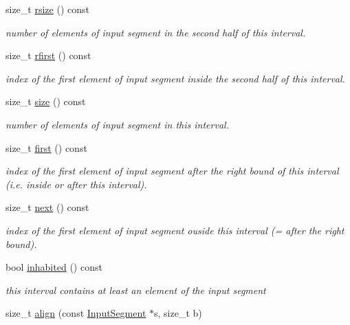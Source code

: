 \begin{DoxyCompactItemize}
size\+\_\+t \mbox{\hyperlink{classAlignedInterval_abf3b5daa25e0d74999e5a2d1d04cd185}{rsize}} () const
\begin{DoxyCompactList}\small\item\em number of elements of input segment in the second half of this interval. \end{DoxyCompactList}\item 
size\+\_\+t \mbox{\hyperlink{classAlignedInterval_aa7c4a66d5fd0ff2dc29a4fea57f0c561}{rfirst}} () const
\begin{DoxyCompactList}\small\item\em index of the first element of input segment inside the second half of this interval. \end{DoxyCompactList}\item 
size\+\_\+t \mbox{\hyperlink{classAlignedInterval_aacfe86f36bfd28f6a56c7a673ed7dad7}{size}} () const
\begin{DoxyCompactList}\small\item\em number of elements of input segment in this interval. \end{DoxyCompactList}\item 
size\+\_\+t \mbox{\hyperlink{classAlignedInterval_a1660736ae6e829e6c92616e49784a583}{first}} () const
\begin{DoxyCompactList}\small\item\em index of the first element of input segment after the right bound of this interval (i.\+e. inside or after this interval). \end{DoxyCompactList}\item 
size\+\_\+t \mbox{\hyperlink{classAlignedInterval_ac9617c302c66993c1f84c757f2c71d16}{next}} () const
\begin{DoxyCompactList}\small\item\em index of the first element of input segment ouside this interval (= after the right bound). \end{DoxyCompactList}\item 
bool \mbox{\hyperlink{classAlignedInterval_adefeebb5ddd10a68e83ed7382626d380}{inhabited}} () const
\begin{DoxyCompactList}\small\item\em this interval contains at least an element of the input segment \end{DoxyCompactList}\item 
size\+\_\+t \mbox{\hyperlink{group__segment_ga25f42094dbb3623c73df11dd85596185}{align}} (const \mbox{\hyperlink{classInputSegment}{Input\+Segment}} $\ast$s, size\+\_\+t b)

\end{DoxyCompactItemize}
